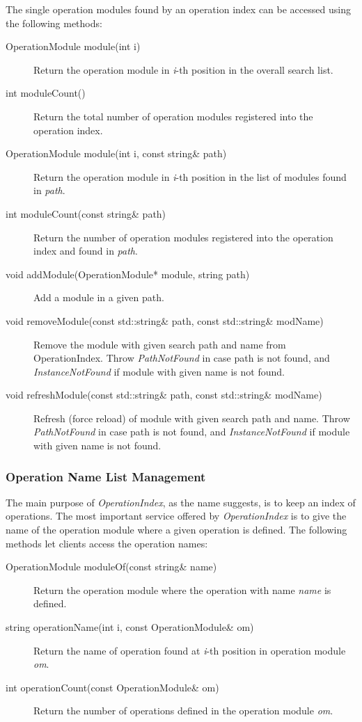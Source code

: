 \documentclass[a4paper,twoside]{tce}
\begin{document}
The single operation modules found by an operation index can be accessed
using the following methods:
\begin{description}
\item[OperationModule module(int i)]%
  Return the operation module in \emph{i}-th position in the overall search
  list.
\item[int moduleCount()]%
  Return the total number of operation modules registered into the
  operation index.
\item[OperationModule module(int i, const string\& path)]%
  Return the operation module in \emph{i}-th position in the list of
  modules found in \emph{path}.
\item[int moduleCount(const string\& path)]%
  Return the number of operation modules registered into the operation
  index and found in \emph{path}.
\item[void addModule(OperationModule* module, string path)]%
  Add a module in a given path.
\item[void removeModule(const std::string\& path, const std::string\& modName)]%

  Remove the module with given search path and name from OperationIndex.
  Throw \emph{PathNotFound} in case path is not found, and 
  \emph{InstanceNotFound} if module with given name is not found.

\item[void refreshModule(const std::string\& path, const std::string\& modName)]%

  Refresh (force reload) of module with given search path and name.
  Throw \emph{PathNotFound} in case path is not found, and 
  \emph{InstanceNotFound} if module with given name is not found.

\end{description}

\subsubsection{Operation Name List Management}

The main purpose of \emph{OperationIndex}, as the name suggests, is to keep
an index of operations.  The most important service offered by
\emph{OperationIndex} is to give the name of the operation module where a
given operation is defined.  The following methods let clients access the
operation names:
\begin{description}
\item[OperationModule moduleOf(const string\& name)]%
  Return the operation module where the operation with name \emph{name} is
  defined.
\item[string operationName(int i, const OperationModule\& om)]%
  Return the name of operation found at \emph{i}-th position in operation
  module \emph{om}.
\item[int operationCount(const OperationModule\& om)]%
  Return the number of operations defined in the operation module
  \emph{om}.
\end{description}
\end{document}
